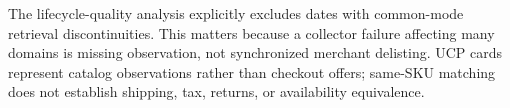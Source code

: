 The lifecycle-quality analysis explicitly excludes dates with common-mode retrieval
discontinuities. This matters because a collector failure affecting many domains is
missing observation, not synchronized merchant delisting. UCP cards represent
catalog observations rather than checkout offers; same-SKU matching does not establish
shipping, tax, returns, or availability equivalence.